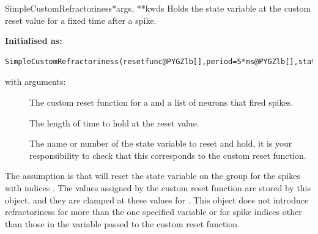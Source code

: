 \documentclass[letterpaper,10pt,english]{manual}
\begin{document}
\hypertarget{brian.SimpleCustomRefractoriness}{}\begin{classdesc}{SimpleCustomRefractoriness}{*args, **kwds}
Holds the state variable at the custom reset value for a fixed time after a spike.

\textbf{Initialised as:}

\begin{Verbatim}[commandchars=@\[\]]
SimpleCustomRefractoriness(resetfunc@PYGZlb[],period=5*ms@PYGZlb[],state=0@PYGZrb[]@PYGZrb[])
\end{Verbatim}

with arguments:
\begin{description}
\item[] \leavevmode
The custom reset function  for  a
\hyperlink{brian.NeuronGroup}{} and  a list of neurons that
fired spikes.

\item[] \leavevmode
The length of time to hold at the reset value.

\item[] \leavevmode
The name or number of the state variable to reset and hold,
it is your responsibility to check that this corresponds to
the custom reset function.

\end{description}

The assumption is that  will reset the state
variable  on the group  for the spikes with indices
. The values assigned by the custom reset function are
stored by this object, and they are clamped at these values for
. This object does not introduce refractoriness for more
than the one specified variable  or for spike indices
other than those in the variable  passed to the custom
reset function.
\end{classdesc}
\end{document}

